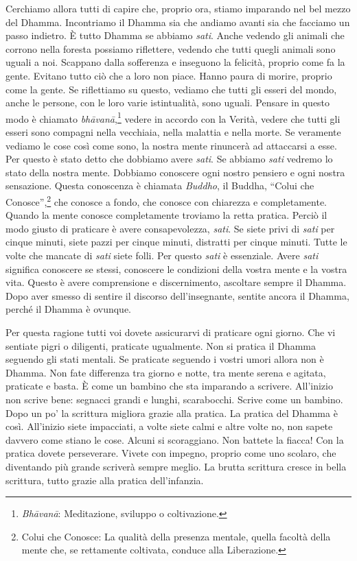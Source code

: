 Cerchiamo allora tutti di capire che, proprio ora, stiamo imparando nel
bel mezzo del Dhamma. Incontriamo il Dhamma sia che andiamo avanti sia
che facciamo un passo indietro. È tutto Dhamma se abbiamo \emph{sati}.
Anche vedendo gli animali che corrono nella foresta possiamo riflettere,
vedendo che tutti quegli animali sono uguali a noi. Scappano dalla
sofferenza e inseguono la felicità, proprio come fa la gente. Evitano
tutto ciò che a loro non piace. Hanno paura di morire, proprio come la
gente. Se riflettiamo su questo, vediamo che tutti gli esseri del mondo,
anche le persone, con le loro varie istintualità, sono uguali. Pensare
in questo modo è chiamato \emph{bhāvanā},\footnote{\emph{Bhāvanā}:
  Meditazione, sviluppo o coltivazione.} vedere in accordo con la
Verità, vedere che tutti gli esseri sono compagni nella vecchiaia, nella
malattia e nella morte. Se veramente vediamo le cose così come sono, la
nostra mente rinuncerà ad attaccarsi a esse. Per questo è stato detto
che dobbiamo avere \emph{sati}. Se abbiamo \emph{sati} vedremo lo stato
della nostra mente. Dobbiamo conoscere ogni nostro pensiero e ogni
nostra sensazione. Questa conoscenza è chiamata \emph{Buddho}, il
Buddha, ``Colui che Conosce'',\footnote{Colui che Conosce: La qualità
  della presenza mentale, quella facoltà della mente che, se rettamente
  coltivata, conduce alla Liberazione.} che conosce a fondo, che conosce
con chiarezza e completamente. Quando la mente conosce completamente
troviamo la retta pratica. Perciò il modo giusto di praticare è avere
consapevolezza, \emph{sati}. Se siete privi di \emph{sati} per cinque
minuti, siete pazzi per cinque minuti, distratti per cinque minuti.
Tutte le volte che mancate di \emph{sati} siete folli. Per questo
\emph{sati} è essenziale. Avere \emph{sati} significa conoscere se
stessi, conoscere le condizioni della vostra mente e la vostra vita.
Questo è avere comprensione e discernimento, ascoltare sempre il Dhamma.
Dopo aver smesso di sentire il discorso dell'insegnante, sentite ancora
il Dhamma, perché il Dhamma è ovunque.

Per questa ragione tutti voi dovete assicurarvi di praticare ogni
giorno. Che vi sentiate pigri o diligenti, praticate ugualmente. Non si
pratica il Dhamma seguendo gli stati mentali. Se praticate seguendo i
vostri umori allora non è Dhamma. Non fate differenza tra giorno e
notte, tra mente serena e agitata, praticate e basta. È come un bambino
che sta imparando a scrivere. All'inizio non scrive bene: segnacci
grandi e lunghi, scarabocchi. Scrive come un bambino. Dopo un po' la
scrittura migliora grazie alla pratica. La pratica del Dhamma è così.
All'inizio siete impacciati, a volte siete calmi e altre volte no, non
sapete davvero come stiano le cose. Alcuni si scoraggiano. Non battete
la fiacca! Con la pratica dovete perseverare. Vivete con impegno,
proprio come uno scolaro, che diventando più grande scriverà sempre
meglio. La brutta scrittura cresce in bella scrittura, tutto grazie alla
pratica dell'infanzia.

